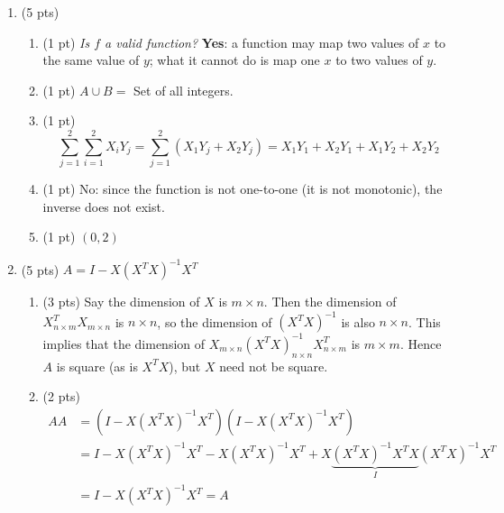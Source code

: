 \documentclass{./../../latex/tests}
\begin{document}
\thispagestyle{plain}
\vspace{0.5em}

\begin{enumerate}

\item (5 pts)
\begin{enumerate}
\item (1 pt) \textit{Is $f$ a valid function?} \textbf{Yes}: a function may map two values of $x$ to the same value of $y$; what it cannot do is map one $x$ to two values of $y$.
\item (1 pt) $A \cup B =$ Set of all integers.
\item (1 pt) \[\sum_{j=1}^2 \sum_{i=1}^2 X_i Y_j = \sum_{j=1}^2 \left( X_1 Y_j + X_2 Y_j \right) = X_1 Y_1 + X_2 Y_1 + X_1 Y_2 + X_2 Y_2 \]
\item (1 pt) No: since the function is not one-to-one (it is not monotonic), the inverse does not exist.
\item (1 pt) $(0, 2)$
\end{enumerate}

\item (5 pts) $A = I - X(X^T X)^{-1}X^T$
\begin{enumerate}
\item (3 pts) Say the dimension of $X$ is \( m \times n \). Then the dimension of \( X^T_{n \times m} X_{m \times n} \) is \( n \times n \), so the dimension of \( (X^T X)^{-1} \) is also \( n \times n \). This implies that the dimension of \( X_{m \times n}(X^T X)^{-1}_{n \times n} X^T_{n \times m} \) is \( m \times m \). Hence $A$ is square (as is $X^T X$), but $X$ need not be square.
\item (2 pts)
\[
\begin{aligned}
A A &= (I-X(X^T X)^{-1} X^T)(I-X(X^T X)^{-1} X^T) \\
& = I-X(X^T X)^{-1} X^T-X(X^T X)^{-1} X^T+X\underbrace{(X^T X)^{-1} X^T X}_{I}(X^T X)^{-1} X^T \\
&= I-X(X^T X)^{-1} X^T = A
\end{aligned}
\]
\end{enumerate}


\end{enumerate}
\end{document}
